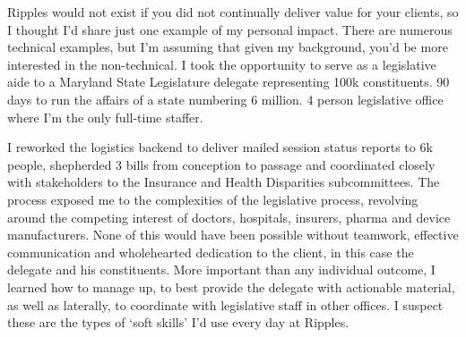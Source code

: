 \documentclass[a4paper]{../res}
\begin{document}
\begin{sloppypar}
\begin{resume}
Ripples would not exist if you did not continually deliver value for your clients, so I thought I'd share just one example of my personal impact. There are numerous technical examples, but I'm assuming that given my background, you'd be more interested in the non-technical. I took the opportunity to serve as a legislative aide to a Maryland State Legislature delegate representing 100k constituents. 90 days to run the affairs of a state numbering 6 million. 4 person legislative office where I'm the only full-time staffer.

I reworked the logistics backend to deliver mailed session status reports to 6k people, shepherded 3 bills from conception to passage and coordinated closely with stakeholders to the Insurance and Health Disparities subcommittees. The process exposed me to the complexities of the legislative process, revolving around the competing interest of doctors, hospitals, insurers, pharma and device manufacturers. None of this would have been possible without teamwork, effective communication and wholehearted dedication to the client, in this case the delegate and his constituents. More important than any individual outcome, I learned how to manage up, to best provide the delegate with actionable material, as well as laterally, to coordinate with legislative staff in other offices. I suspect these are the types of `soft skills' I'd use every day at Ripples.







\end{resume}
\end{sloppypar}
\end{document}
